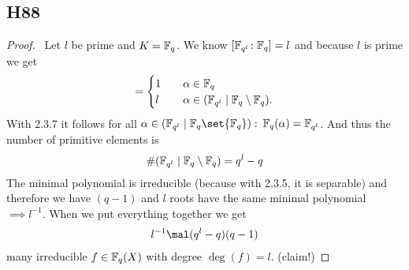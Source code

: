 \subsection{H88}
\begin{proof}\
	Let $l$ be prime and $K = \mathbb{F}_q$.
	We know $[\mathbb{F}_{q^l}\colon \mathbb{F}_q] = l$ and because $l$ is prime we get 
	\begin{align*}
		[\F_q(\alpha)\colon \F] =
		\begin{cases}
			1 & \quad \alpha\in \F_q\\
			l & \quad \alpha \in (\F_{q^l}\mid \F_q\setminus \F_q).
		\end{cases}
	\end{align*}
	With 2.3.7 it follows for all $\alpha \in (\F_{q^l} \mid \F_q \set{\F_q}):$ $\mathbb{F}_q(\alpha) = \mathbb{F}_{q^l}$. And thus the number of primitive elements is 
	\begin{align*}
		\#(\mathbb{F}_{q^l} \mid \mathbb{F}_q \setminus \mathbb{F}_q) = q^l -q
	\end{align*}
	The minimal polynomial is irreducible (because with 2.3.5, it is separable) and therefore we have $(q-1)$ and $l$ roots have the same minimal polynomial $\implies l^{-1}$. When we put everything together we get
	\begin{align*}
		l^{-1}\mal (q^l - q)(q-1)
	\end{align*}
	many irreducible $f \in \mathbb{F}_q(X)$ with degree $\deg(f) = l$. (claim!)
\end{proof}